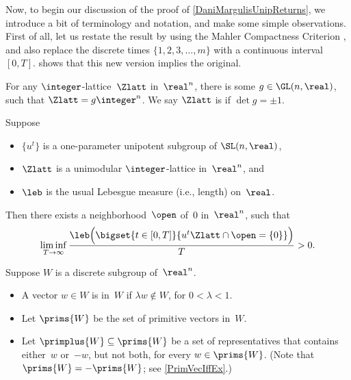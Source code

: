 Now, to begin our discussion of the proof of \cref{DaniMargulisUnipReturns}, we introduce a bit of terminology and notation, and make some simple observations. First of all, let us restate the result by using the Mahler Compactness Criterion , and also replace the discrete times $\{1,2,3,\ldots,m\}$ with a continuous interval $[0,T]$.  shows that this new version implies the original.

\begin{defn} \label{UnimodLattDefn}
For any $\integer$-lattice~$\Zlatt$ in~$\real^n$, there is some $g \in \GL(n,\real)$, such that $\Zlatt = g \integer^n$. We say $\Zlatt$ is  if $\det g = \pm 1$.
\end{defn}

\begin{thm} \label{SpendTimeCpctMahler}
Suppose
\noprelistbreak
	\begin{itemize}
	\item $\{u^t\}$ is a one-parameter unipotent subgroup of\/ $\SL(n,\real)$,
	\item $\Zlatt$ is a unimodular $\integer$-lattice in\/~$\real^n$,
	and
	\item {}$\leb$ is the usual Lebesgue measure\/ \textup(i.e., length\/\textup) on\/~$\real$.
	\end{itemize}
Then there exists a neighborhood~$\open$ of\/~$0$ in\/~$\real^n$, such that
	$$ \liminf_{T \to \infty} \frac{\leb \Bigl( \bigset{ t \in [0,T] }{ u^t \Zlatt \cap \open = \{0\} } \Bigr)}{T} > 0 .$$
\end{thm}



\begin{notation} \label{PrimVecDefn}
Suppose $W$ is a discrete subgroup of~$\real^n$. 
\noprelistbreak
	\begin{itemize}
	\item A vector $w \in W$ is  in~$W$ if $\lambda w \notin W$, for $0 < \lambda < 1$.
	\item Let $\prims{W}$ 
	be the set of primitive vectors in~$W$.
	\item Let 
	$\primplus{W} \subseteq \prims{W}$ be a set of representatives that contains either~$w$ or~$-w$, but not both, for every $w \in \prims{W}$.
	(Note that $\prims{W} = -\prims{W}$; see \cref{PrimVecIffEx}.)
	\end{itemize}
\end{notation}

